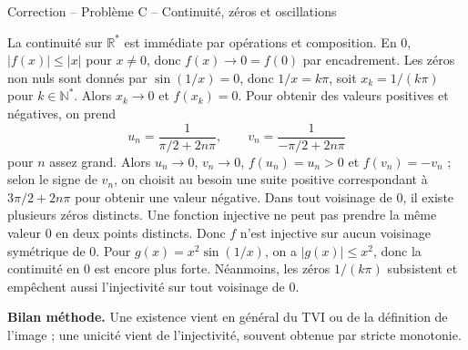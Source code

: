 \documentclass[11pt,a4paper]{article}
\newcommand{\R}{\mathbb{R}}
\newcommand{\N}{\mathbb{N}}
\begin{document}
\begin{corrbox}{Correction -- Problème C -- Continuité, zéros et oscillations}

La continuité sur $\R^*$ est immédiate par opérations et composition. En $0$, $|f(x)|\leq |x|$ pour $x\neq0$, donc $f(x)\to0=f(0)$ par encadrement.
Les zéros non nuls sont donnés par $\sin(1/x)=0$, donc $1/x=k\pi$, soit $x_k=1/(k\pi)$ pour $k\in\N^*$. Alors $x_k\to0$ et $f(x_k)=0$.
Pour obtenir des valeurs positives et négatives, on prend
\[
u_n=\frac1{\pi/2+2n\pi},\qquad v_n=\frac1{-\pi/2+2n\pi}
\]
pour $n$ assez grand. Alors $u_n\to0$, $v_n\to0$, $f(u_n)=u_n>0$ et $f(v_n)=-v_n$ ; selon le signe de $v_n$, on choisit au besoin une suite positive correspondant à $3\pi/2+2n\pi$ pour obtenir une valeur négative. Dans tout voisinage de $0$, il existe plusieurs zéros distincts. Une fonction injective ne peut pas prendre la même valeur $0$ en deux points distincts. Donc $f$ n'est injective sur aucun voisinage symétrique de $0$.
Pour $g(x)=x^2\sin(1/x)$, on a $|g(x)|\leq x^2$, donc la continuité en $0$ est encore plus forte. Néanmoins, les zéros $1/(k\pi)$ subsistent et empêchent aussi l'injectivité sur tout voisinage de $0$.

\medskip
\textbf{Bilan méthode.} Une existence vient en général du TVI ou de la définition de l'image ; une unicité vient de l'injectivité, souvent obtenue par stricte monotonie.
\end{corrbox}
\newpage
\end{document}
